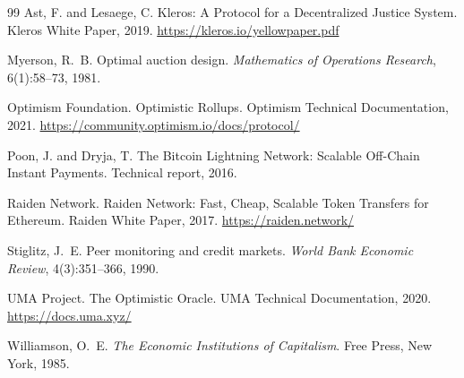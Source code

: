 \documentclass[11pt,a4paper]{article}
\theoremstyle{definition}
\theoremstyle{remark}
\begin{document}
\begin{thebibliography}{99}
Ast, F. and Lesaege, C.
\newblock Kleros: A Protocol for a Decentralized Justice System.
\newblock Kleros White Paper, 2019.
\newblock \url{https://kleros.io/yellowpaper.pdf}

Myerson, R.~B.
\newblock Optimal auction design.
\newblock \emph{Mathematics of Operations Research}, 6(1):58--73, 1981.

Optimism Foundation.
\newblock Optimistic Rollups.
\newblock Optimism Technical Documentation, 2021.
\newblock \url{https://community.optimism.io/docs/protocol/}

Poon, J. and Dryja, T.
\newblock The Bitcoin Lightning Network: Scalable Off-Chain Instant Payments.
\newblock Technical report, 2016.

Raiden Network.
\newblock Raiden Network: Fast, Cheap, Scalable Token Transfers for Ethereum.
\newblock Raiden White Paper, 2017.
\newblock \url{https://raiden.network/}

Stiglitz, J.~E.
\newblock Peer monitoring and credit markets.
\newblock \emph{World Bank Economic Review}, 4(3):351--366, 1990.

UMA Project.
\newblock The Optimistic Oracle.
\newblock UMA Technical Documentation, 2020.
\newblock \url{https://docs.uma.xyz/}

Williamson, O.~E.
\newblock \emph{The Economic Institutions of Capitalism}.
\newblock Free Press, New York, 1985.

\end{thebibliography}
\end{document}
